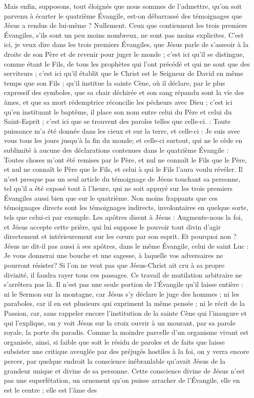 Mais enfin, supposons, tout éloignés que nous sommes de l’admettre, qu’on soit parvenu à écarter le quatrième Évangile, est-on débarrassé des témoignages que Jésus a rendus de lui-même ? Nullement. Ceux que contiennent les trois premiers Évangiles, s’ils sont un peu moins nombreux, ne sont pas moins explicites. C’est ici, je veux dire dans les trois premiers Évangiles, que Jésus parle de s’asseoir à la droite de son Père et de revenir pour juger le monde ; c’est ici qu’il se distingue, comme étant le Fils, de tous les prophètes qui l’ont précédé et qui ne sont que des serviteurs ; c’est ici qu’il établit que le Christ est le Seigneur de David en même temps que son Fils ; qu’il institue la sainte Cène, où il déclare, par le plus expressif des symboles, que sa chair déchirée et son sang répandu sont la vie des âmes, et que sa mort rédemptrice réconcilie les pécheurs avec Dieu ; c’est ici qu’en instituant le baptême, il place son nom entre celui du Père et celui du Saint-Esprit ; c’est ici que se trouvent des paroles telles que celle-ci. : \Og{} Toute puissance m’a été donnée dans les cieux et sur la terre\Fg{}, et celle-ci : \Og{} Je suis avec vous tous les jours jusqu’à la fin du monde\Fg{}; et celle-ci surtout, qui ne le cède en sublimité à aucune des déclarations contenues dans le quatrième Évangile : \Og{} Toutes choses m’ont été remises par le Père, et nul ne connaît le Fils que le Père, et nul ne connaît le Père que le Fils, et celui à qui le Fils l’aura voulu révéler.\Fg{} Il n’est presque pas un seul article du témoignage de Jésus touchant sa personne, tel qu’il a été exposé tout à l’heure, qui ne soit appuyé sur les trois premiers Évangiles aussi bien que sur le quatrième. Non moins frappants que ces témoignages directs sont les témoignages indirects, involontaires en quelque sorte, tels que celui-ci par exemple. Les apôtres disent à Jésus : \Og{} Augmente-nous la foi\Fg{}, et Jésus accepte cette prière, qui lui suppose le pouvoir tout divin d’agir directement et intérieurement sur les cœurs par son esprit. Et pourquoi non ? Jésus ne dit-il pas aussi à ses apôtres, dans le même Évangile, celui de saint Luc : \Og{} Je vous donnerai une bouche et une sagesse, à laquelle vos adversaires ne pourront résister\Fg{}? Si l’on ne veut pas que Jésus-Christ ait cru à sa propre divinité, il faudra rayer tous ces passages. Ce travail de mutilation arbitraire ne s’arrêtera pas là. Il n’est pas une seule portion de l’Évangile qu’il laisse entière : ni le Sermon sur la montagne, car Jésus s’y déclare le juge des hommes ; ni les paraboles, car il en est plusieurs qui expriment la même pensée ; ni le récit de la Passion, car, sans rappeler encore l’institution de la sainte Cène qui l’inaugure et qui l’explique, on y voit Jésus sur la croix ouvrir à un mourant, par sa parole royale, la porte du paradis. Comme la moindre parcelle d’un organisme vivant est organisée, ainsi, si faible que soit le résidu de paroles et de faits que laisse subsister une critique aveuglée par des préjugés hostiles à la foi, on y verra encore percer, par quelque endroit la conscience inébranlable qu’avait Jésus de la grandeur unique et divine de sa personne. Cette conscience divine de Jésus n’est pas une superfétation, un ornement qu’on puisse arracher de l’Évangile, elle en est le centre ; elle est l’âme des 